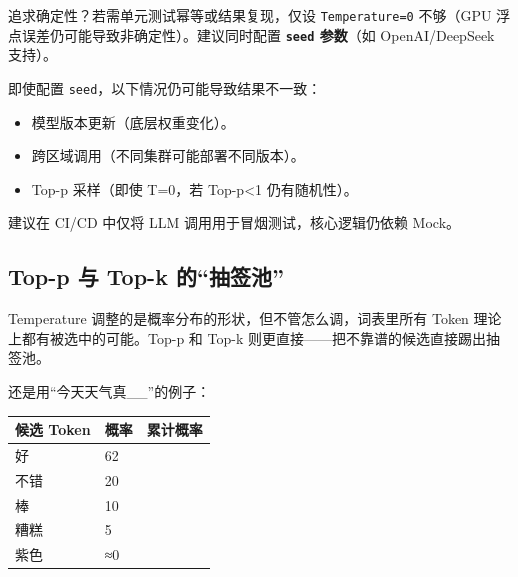 \documentclass[9pt,a4paper,twocolumn]{ctexart}
\begin{document}
追求确定性？若需单元测试幂等或结果复现，仅设 \texttt{Temperature=0} 不够（GPU 浮点误差仍可能导致非确定性）。建议同时配置 \textbf{\texttt{seed} 参数}（如 OpenAI/DeepSeek 支持）。



即使配置 \texttt{seed}，以下情况仍可能导致结果不一致：


\begin{itemize}[itemsep=1pt, topsep=2pt]
  \item 模型版本更新（底层权重变化）。
  \item 跨区域调用（不同集群可能部署不同版本）。
  \item Top-p 采样（即使 T=0，若 Top-p<1 仍有随机性）。
\end{itemize}


建议在 CI/CD 中仅将 LLM 调用用于冒烟测试，核心逻辑仍依赖 Mock。



\subsection*{Top-p 与 Top-k 的“抽签池”}


Temperature 调整的是概率分布的形状，但不管怎么调，词表里所有 Token 理论上都有被选中的可能。Top-p 和 Top-k 则更直接——把不靠谱的候选直接踢出抽签池。



还是用“今天天气真\_\_”的例子：


{\footnotesize
\begin{tabular}{|p{}|p{}|p{}|}
\hline
\textbf{候选 Token} & \textbf{概率} & \textbf{累计概率} \\
\hline
好 & 62\\%
\hline
不错 & 20\\%
\hline
棒 & 10\\%
\hline
糟糕 & 5\\%
\hline
紫色 & ≈0\\%
\hline
\end{tabular}
}
\end{document}
